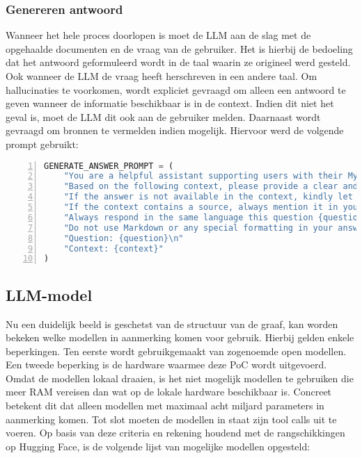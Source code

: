 \subsubsection{Genereren antwoord}

Wanneer het hele proces doorlopen is moet de LLM aan de slag met de opgehaalde documenten en de vraag van de gebruiker. Het is hierbij de bedoeling dat het antwoord geformuleerd wordt in de taal waarin ze origineel werd gesteld. Ook wanneer de LLM de vraag heeft herschreven in een andere taal. Om hallucinaties te voorkomen, wordt expliciet gevraagd om alleen een antwoord te geven wanneer de informatie beschikbaar is in de context. Indien dit niet het geval is, moet de LLM dit ook aan de gebruiker melden. Daarnaast wordt gevraagd om bronnen te vermelden indien mogelijk. Hiervoor werd de volgende prompt gebruikt: 

\begin{lstlisting}[basicstyle=\small, frame=single, breaklines=true, postbreak=\mbox{\textcolor{red}{$\hookrightarrow$}\space}, escapeinside ={\%,}, escapechar={!}, numbers=left, language=Python, caption=Prompt voor genereren van antwoord op basis van de opgehaalde context]
GENERATE_ANSWER_PROMPT = (
    "You are a helpful assistant supporting users with their MyMinfin IT-related questions.\n"
    "Based on the following context, please provide a clear and complete answer.\n"
    "If the answer is not available in the context, kindly let the user know that you don't have enough information.\n"
    "If the context contains a source, always mention it in your answer as the reference.\n"
    "Always respond in the same language this question {question} is asked, even if the context is in a different language.\n"
    "Do not use Markdown or any special formatting in your answer, respond in plain text only.\n\n"
    "Question: {question}\n"
    "Context: {context}"
)
\end{lstlisting}

\subsection{LLM-model}

Nu een duidelijk beeld is geschetst van de structuur van de graaf, kan worden bekeken welke modellen in aanmerking komen voor gebruik. Hierbij gelden enkele beperkingen. Ten eerste wordt gebruikgemaakt van zogenoemde open modellen. Een tweede beperking is de hardware waarmee deze PoC wordt uitgevoerd. Omdat de modellen lokaal draaien, is het niet mogelijk modellen te gebruiken die meer RAM vereisen dan wat op de lokale hardware beschikbaar is. Concreet betekent dit dat alleen modellen met maximaal acht miljard parameters in aanmerking komen. Tot slot moeten de modellen in staat zijn tool calls uit te voeren. Op basis van deze criteria en rekening houdend met de rangschikkingen op Hugging Face, is de volgende lijst van mogelijke modellen opgesteld:


